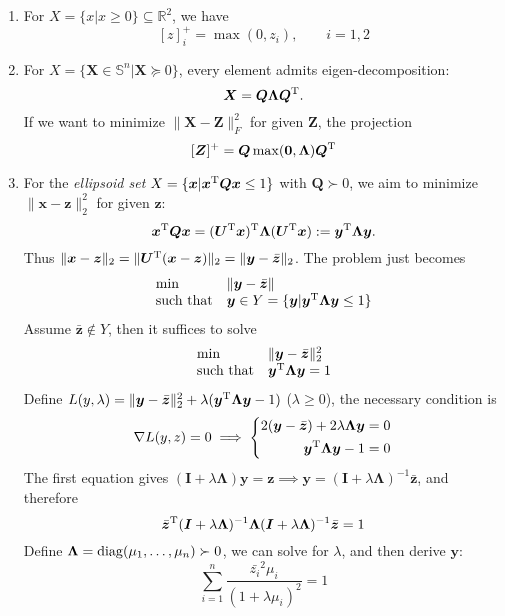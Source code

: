 \begin{example}
\begin{enumerate}
\item
For $X=\{x|x\ge0\}\subseteq\mathbb{R}^2$, we have
\[
[z]^+_i=\max(0,z_i),\qquad i=1,2
\]
\item
For $X=\{\bm X\in\mathbb{S}^n|\bm X\succeq0\}$, every element admits eigen-decomposition:
\[
\bm X=\bm Q\bm{\Lambda}\bm Q^{\mathrm T}.
\]
If we want to minimize $\|\bm X-\bm Z\|_F^2$ for given $\bm Z$, the projection
\[
[\bm Z]^+=\bm Q\max(\bm0,\bm\Lambda)\bm Q^{\mathrm T}
\]
\item
For the \emph{ellipsoid set} $X=\{\bm x|\bm x^{\mathrm T}\bm Q\bm x\le1\}$ with $\bm Q\succ0$, we aim to minimize $\|\bm x-\bm z\|_2^2$ for given $\bm z$:
\[
\bm x^{\mathrm T}\bm Q\bm x=(\bm U^{\mathrm T}\bm x)^{\mathrm T}\bm\Lambda(\bm U^{\mathrm T}\bm x):=\bm y^{\mathrm T}\bm\Lambda\bm y.
\]
Thus $\|\bm x-\bm z\|_2=\|\bm U^{\mathrm T}(\bm x-\bm z)\|_2=\|\bm y-\bar{\bm z}\|_2$. The problem just becomes
\[
\begin{array}{ll}
\min&\|\bm y-\bar{\bm z}\|\\
\mbox{such that}&\bm y\in Y=\{\bm y|\bm y^{\mathrm T}\bm\Lambda\bm y\le1\}
\end{array}
\]
Assume $\bar{\bm z}\notin Y$, then it suffices to solve
\[
\begin{array}{ll}
\min&\|\bm y-\bar{\bm z}\|_2^2\\
\mbox{such that}&\bm y^{\mathrm T}\bm\Lambda\bm y=1
\end{array}
\]
Define $L(y,\lambda)=\|\bm y-\bar{\bm z}\|_2^2+\lambda(\bm y^{\mathrm T}\bm\Lambda\bm y-1)$ ($\lambda\ge0$), the necessary condition is
\[
\nabla L(y,z)=0\implies
\left\{
\begin{aligned}
2(\bm y-\bar{\bm z})+2\lambda\bm\Lambda\bm y&=0\\
\bm y^{\mathrm T}\bm\Lambda\bm y-1&=0
\end{aligned}
\right.
\]
The first equation gives $(\bm I+\lambda\bm\Lambda)\bm y=\bm z\implies\bm y=(\bm I+\lambda\bm\Lambda)^{-1}\bar{\bm z}$, and therefore
\[
\bar{\bm z}^{\mathrm T}(\bm I+\lambda\bm\Lambda)^{-1}\bm\Lambda(\bm I+\lambda\bm\Lambda)^{-1}\bar{\bm z}=1
\]
Define $\bm\Lambda=\operatorname{diag}(\mu_1,\dots,\mu_n)\succ0$, we can solve for $\lambda$, and then derive $\bm y$:
\[
\sum_{i=1}^n\frac{\bar{z_i}^2\mu_i}{(1+\lambda\mu_i)^2}=1
\]
\end{enumerate}
\end{example}
